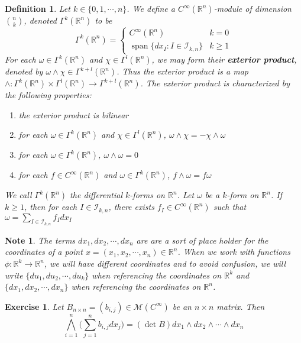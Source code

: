 \documentclass[12pt]{amsart}
\newtheorem{defn}[thm]{Definition}
\newtheorem{note}[thm]{Note}
\newtheorem{ex}[thm]{Exercise}
\DeclareMathOperator{\spn}{span}
\newcommand{\om}{\omega}
\newcommand{\R}{\mathbb{R}}
\newcommand{\MI}{\mathcal{I}}
\newcommand{\MM}{\mathcal{M}}
\begin{document}
	\begin{defn}
		Let $k \in \{0, 1, \cdots, n\}$. We define a $C^{\infty}(\R^n)$-module of dimension ${n \choose k}$, denoted $\Gamma^k(\R^n)$ to be 
		\[
		\Gamma^k(\R^n) =
		\begin{cases}
			C^{\infty}(\R^n) & k = 0 \\
			\spn \{ dx_I: I \in \MI_{k,n} \} & k \geq 1
		\end{cases}
		\]
		For each $\om \in \Gamma^k(\R^n)$ and $\chi \in \Gamma^l(\R^n)$,   we may form their \textbf{exterior product}, denoted by $\om \wedge \chi \in \Gamma^{k+l}(\R^n)$. Thus the exterior product is a map $\wedge : \Gamma^k(\R^n) \times \Gamma^l(\R^n)\rightarrow \Gamma^{k+l}(\R^n)$. The exterior product is characterized by the following properties:
		\begin{enumerate}
			\item the exterior product is bilinear
			\item for each $\om \in \Gamma^k(\R^n)$ and $\chi \in \Gamma^l(\R^n)$, $\om \wedge \chi = - \chi \wedge \om$ 
			\item for each $\om \in \Gamma^k(\R^n)$, $\om \wedge \om = 0$
			\item for each $f \in C^{\infty}(\R^n)$ and $ \om \in \Gamma^k(\R^n)$, $f \wedge \om = f \om$
		\end{enumerate}
		We call $\Gamma^k(\R^n)$ the differential $k$-forms on $\R^n$. Let $\om$ be a $k$-form on $\R^n$. If $k \geq 1$, then for each $I \in \MI_{k,n}$, there exists $f_I \in C^{\infty}(\R^n)$ such that $\om = \sum\limits_{I \in \MI_{k,n}} f_I dx_I$
	\end{defn}
	
	
	\begin{note}
		The terms $dx_1, dx_2, \cdots, dx_n$ are are a sort of place holder for the coordinates of a point $x = (x_1, x_2, \cdots, x_n) \in \R^n$. When we work with functions $\phi: \R^k \rightarrow \R^n$, we will have different coordinates and to avoid confusion, we will write $\{du_1, du_2, \cdots, du_k\}$ when referencing the coordinates on $\R^k$ and $\{dx_1, dx_2, \cdots, dx_n\}$ when referencing the coordinates on $\R^n$. 
	\end{note}

	\begin{ex}
		Let $B_{n\times n} = (b_{i,j}) \in \MM(C^{\infty})$ be an $n\times n$ matrix. Then $$\bigwedge_{i=1}^n \bigg(\sum_{j=1}^n b_{i,j}dx_j\bigg) = (\det B) dx_1 \wedge dx_2 \wedge \cdots \wedge dx_n$$
	\end{ex}
\end{document}
